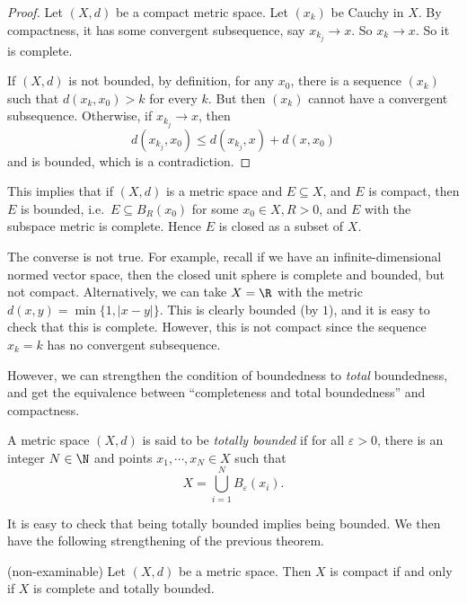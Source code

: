 \documentclass[a4paper]{article}
\begin{document}
\begin{proof}
  Let $(X, d)$ be a compact metric space. Let $(x_k)$ be Cauchy in $X$. By compactness, it has some convergent subsequence, say $x_{k_j} \to x$. So $x_k \to x$. So it is complete.

  If $(X, d)$ is not bounded, by definition, for any $x_0$, there is a sequence $(x_k)$ such that $d(x_k, x_0) > k$ for every $k$. But then $(x_k)$ cannot have a convergent subsequence. Otherwise, if $x_{k_j} \to x$, then
  \[
    d(x_{k_j}, x_0) \leq d(x_{k_j}, x) + d(x, x_0)
  \]
  and is bounded, which is a contradiction.
\end{proof}
This implies that if $(X, d)$ is a metric space and $E\subseteq X$, and $E$ is compact, then $E$ is bounded, i.e.\ $E \subseteq B_R(x_0)$ for some $x_0 \in X, R > 0$, and $E$ with the subspace metric is complete. Hence $E$ is closed as a subset of $X$.

The converse is not true. For example, recall if we have an infinite-dimensional normed vector space, then the closed unit sphere is complete and bounded, but not compact. Alternatively, we can take $X = \R$ with the metric $d(x, y) = \min\{1, |x - y|\}$. This is clearly bounded (by $1$), and it is easy to check that this is complete. However, this is not compact since the sequence $x_k = k$ has no convergent subsequence.

However, we can strengthen the condition of boundedness to \emph{total} boundedness, and get the equivalence between ``completeness and total boundedness'' and compactness.

\begin{defi}
  A metric space $(X, d)$ is said to be \emph{totally bounded} if for all $\varepsilon > 0$, there is an integer $N \in \N$ and points $x_1, \cdots, x_N \in X$ such that
  \[
    X = \bigcup_{i = 1}^N B_\varepsilon (x_i).
  \]
\end{defi}
It is easy to check that being totally bounded implies being bounded. We then have the following strengthening of the previous theorem.
\begin{thm}(non-examinable)
  Let $(X, d)$ be a metric space. Then $X$ is compact if and only if $X$ is complete and totally bounded.
\end{thm}
\end{document}

